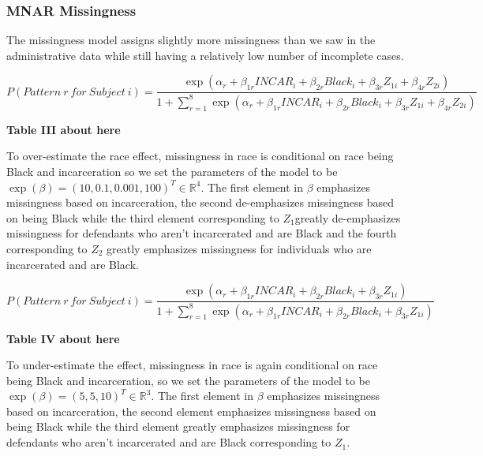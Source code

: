 \documentclass[titlepage]{article}
\begin{document}
\subsubsection{MNAR Missingness}

The missingness model assigns slightly more missingness than we saw in the administrative data while still having a relatively low number of incomplete cases.

\begin{equation}\label{eq:miss-model-4par}
    P(Pattern ~ r ~ for ~ Subject ~ i) = \frac{\exp\left(\alpha_r + \beta_{1r} INCAR_i + \beta_{2r} Black_i + \beta_{3r} Z_{1i} + \beta_{4r} Z_{2i}\right)}{1 + \sum_{r=1}^8 \exp\left(\alpha_r + \beta_{1r} INCAR_i + \beta_{2r} Black_i + \beta_{3r} Z_{1i} + \beta_{4r} Z_{2i}\right)}
\end{equation}

\begin{center}
    \textbf{Table III about here}
\end{center}

To over-estimate the race effect, missingness in race is conditional on race being Black and incarceration so we set the parameters of the model to be \(\exp(\beta) = (10, 0.1, 0.001, 100)^T \in \mathbb{R}^4\). The first element in $\beta$ emphasizes missingness based on incarceration, the second de-emphasizes missingness based on being Black while the third element corresponding to \(Z_1\)greatly de-emphasizes missingness for defendants who aren’t incarcerated and are Black and the fourth corresponding to \(Z_2\) greatly emphasizes missingness for individuals who are incarcerated and are Black.

\begin{equation}\label{eq:miss-model-3par}
    P(Pattern ~ r ~ for ~ Subject ~ i) = \frac{\exp\left(\alpha_r + \beta_{1r} INCAR_i + \beta_{2r} Black_i + \beta_{3r} Z_{1i}\right)}{1 + \sum_{r=1}^8 \exp\left(\alpha_r + \beta_{1r} INCAR_i + \beta_{2r} Black_i + \beta_{3r} Z_{1i}\right)}
\end{equation}

\begin{center}
    \textbf{Table IV about here}
\end{center}

To under-estimate the effect, missingness in race is again conditional on race being Black and incarceration, so we set the parameters of the model to be \(\exp(\beta) = (5,5,10)^T \in \mathbb{R}^3\). The first element in \(\beta\) emphasizes missingness based on incarceration, the second element emphasizes missingness based on being Black while the third element greatly emphasizes missingness for defendants who aren’t incarcerated and are Black corresponding to \(Z_1\).
\end{document}
